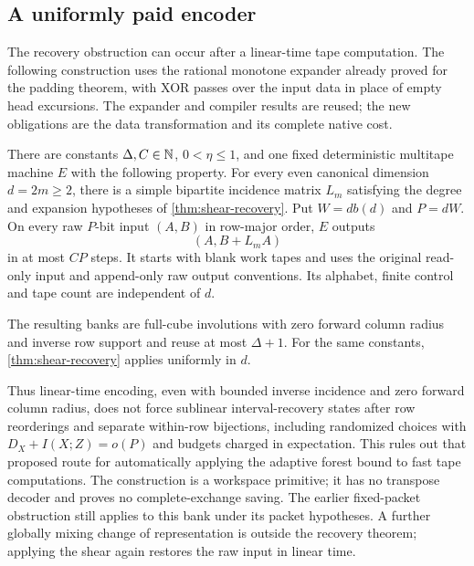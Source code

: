 \subsection{A uniformly paid encoder}

The recovery obstruction can occur after a linear-time tape computation.
The following construction uses the rational monotone expander already
proved for the padding theorem, with XOR passes over the input data in place of
empty head excursions. The expander and compiler results are reused; the
new obligations are the data transformation and its complete native cost.

\begin{theorem}\label{thm:cheap-shear}
There are constants $\Delta,C\in\mathbb N$, $0<\eta\le1$, and one fixed
deterministic multitape machine $E$ with the following property. For every
even canonical dimension $d=2m\ge2$, there is a simple bipartite incidence
matrix $L_m$ satisfying the degree and expansion hypotheses of
\cref{thm:shear-recovery}. Put $W=db(d)$ and $P=dW$. On every raw $P$-bit
input $(A,B)$ in row-major order, $E$ outputs
\[
 (A,B+L_mA)
\]
in at most $CP$ steps. It starts with blank work tapes and uses the original
read-only input and append-only raw output conventions. Its alphabet,
finite control and tape count are independent of $d$.

The resulting banks are full-cube involutions with zero forward column
radius and inverse row support and reuse at most $\Delta+1$. For the
same constants, \cref{thm:shear-recovery} applies uniformly in $d$.
\end{theorem}

Thus linear-time encoding, even with bounded inverse incidence and zero
forward column radius, does not force sublinear interval-recovery states
after row reorderings and separate within-row bijections, including randomized
choices with $D_X+I(X;Z)=o(P)$ and budgets charged in expectation. This rules out
that proposed route for automatically applying the adaptive forest bound
to fast tape computations. The construction is a workspace primitive; it
has no transpose decoder and proves no complete-exchange saving. The
earlier fixed-packet obstruction still applies to this bank under its
packet hypotheses. A further globally mixing change of representation is
outside the recovery theorem; applying the shear again restores the raw
input in linear time.

